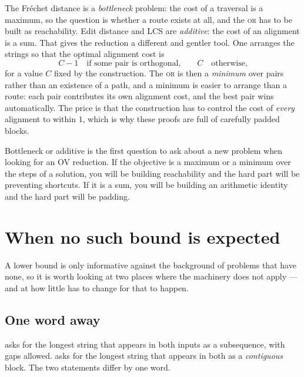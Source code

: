 The Fr\'echet distance is a \emph{bottleneck} problem: the cost of a traversal
is a maximum, so the question is whether a route exists at all, and the
\textsc{or} has to be built as reachability. Edit distance and LCS are
\emph{additive}: the cost of an alignment is a sum. That gives the reduction a
different and gentler tool. One arranges the strings so that the optimal
alignment cost is
\[ C - 1 \quad\text{if some pair is orthogonal,} \qquad
   C \quad\text{otherwise,} \]
for a value $C$ fixed by the construction. The \textsc{or} is then a
\emph{minimum} over pairs rather than an existence of a path, and a minimum is
easier to arrange than a route: each pair contributes its own alignment cost,
and the best pair wins automatically. The price is that the construction has to
control the cost of \emph{every} alignment to within $1$, which is why these
proofs are full of carefully padded blocks.

\begin{intuition}
Bottleneck or additive is the first question to ask about a new problem when
looking for an OV reduction. If the objective is a maximum or a minimum over
the steps of a solution, you will be building reachability and the hard part
will be preventing shortcuts. If it is a sum, you will be building an
arithmetic identity and the hard part will be padding.
\end{intuition}

\section{When no such bound is expected}
\label{sec:no-lower-bound}

A lower bound is only informative against the background of problems that have
none, so it is worth looking at two places where the machinery does not apply
--- and at how little has to change for that to happen.

\subsection{One word away}

 asks for the longest string that appears in
both inputs as a subsequence, with gaps allowed.  asks for the longest string that appears in both as a
\emph{contiguous} block. The two statements differ by one word.

